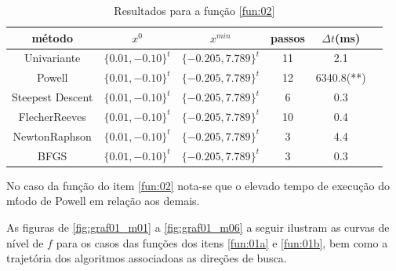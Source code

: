 \documentclass[10pt, a4paper]{article}
\begin{document}
\begin{table}[H]
      \small
      \centering
      \caption{Resultados para a fun\c c\~ao \ref{fun:02}}
      \begin{tabular}{c|c|c|c|c|c}
            m\'etodo           & $x^0$ & $x^{min}$ & passos & $\Delta t$(ms) \\
            \hline
            Univariante         & $\{0.01,-0.10\}^t$     & $\{-0.205,7.789\}^t$  & 11 & 2.1 \\
            Powell              & $\{0.01,-0.10\}^t$     & $\{-0.205,7.789\}^t$  & 12 & 6340.8(**)  \\
            Steepest Descent    & $\{0.01,-0.10\}^t$     & $\{-0.205,7.789\}^t$  &  6 & 0.3 \\
            Flecher\-Reeves     & $\{0.01,-0.10\}^t$     & $\{-0.205,7.789\}^t$  & 10 & 0.4 \\
            Newton\-Raphson     & $\{0.01,-0.10\}^t$     & $\{-0.205,7.789\}^t$  &  3 & 4.4 \\
            BFGS                & $\{0.01,-0.10\}^t$     & $\{-0.205,7.789\}^t$  &  3 & 0.3 \\
     \end{tabular}
      \label{table:resultadosf2}
\end{table}

No caso da fun\c c\~ao do item \ref{fun:02} nota-se que o elevado tempo de execu\c c\~ao do m\'todo de Powell em rela\c c\~ao aos demais.

As figuras de \ref{fig:graf01_m01} a \ref{fig:graf01_m06} a seguir ilustram as curvas de n\'ivel de $f$ para os casos das fun\c c\~oes dos itens \ref{fun:01a} e \ref{fun:01b}, bem como a trajet\'oria dos algoritmos associadoas as dire\c c\~oes de busca.
\end{document}
